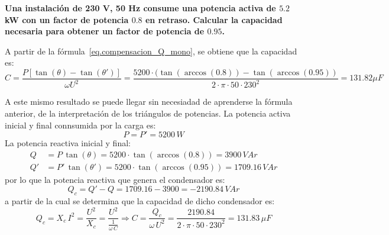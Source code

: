 	\begin{example}\label{ex.condensador_Q}
	    \textbf{Una instalación de 230 V, 50 Hz consume una potencia activa de $5.2$ kW con un factor de potencia $0.8$ en retraso. Calcular la capacidad necesaria para obtener un factor de potencia de $0.95$.}
	    
	    A partir de la fórmula~\eqref{eq.compensacion_Q_mono}, se obtiene que la capacidad es:
	    \begin{equation*}
	        C=\frac{P \left[\tan (\theta) - \tan (\theta')\right]}{\omega U^2}=\dfrac{5200\cdot(\tan(\arccos(0.8))-\tan(\arccos(0.95))}{2\cdot\pi\cdot 50\cdot 230^2}=131.82\mu F
	    \end{equation*}
	    
	    A este mismo resultado se puede llegar sin necesiadad de aprenderse la fórmula anterior, de la interpretación de los triángulos de potencias. La potencia activa inicial y final connsumida por la carga es:
	    \begin{equation*}
	        P=P'=5200\,W
	    \end{equation*}
	    La potencia reactiva inicial y final:
	    \begin{align*}
	        Q&=P\,\tan(\theta)=5200\cdot\tan(\arccos(0.8))=3900\,VAr\\
	        Q'&=P'\,\tan(\theta')=5200\cdot\tan(\arccos(0.95))=1709.16\,VAr
	    \end{align*}
	    por lo que la potencia reactiva que genera el condensador es: 
	    \begin{equation*}
	        Q_c=Q'-Q=1709.16-3900=-2190.84\,VAr
	    \end{equation*}
	    a partir de la cual se determina que la capacidad de dicho condensador es:
	    \begin{equation*}
	        Q_c=X_c\,I^2=\dfrac{U^2}{X_c}=\dfrac{U^2}{\frac{1}{\omega\,C}}\Rightarrow C=\dfrac{Q_c}{\omega\,U^2}=\dfrac{2190.84}{2\cdot\pi\cdot 50\cdot 230^2}=131.83\,\mu F
	    \end{equation*}
	\end{example}
	

	

